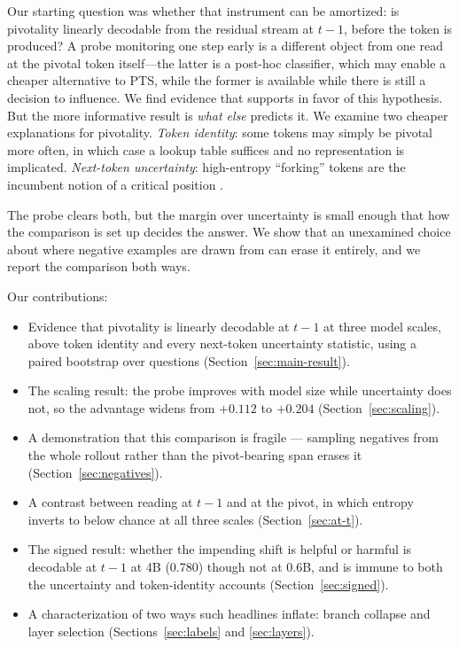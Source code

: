 \documentclass{article}
\begin{document}
Our starting question was whether that instrument can be amortized: is
pivotality linearly decodable from the residual stream at $t-1$, before the
token is produced? A probe monitoring one step early is a different object from
one read at the pivotal token itself---the latter is a post-hoc
classifier, which may enable a cheaper alternative to PTS, 
while the former is available while there is still a decision to
influence. We find evidence that supports in favor of this hypothesis. 
But the more informative result is \emph{what else} predicts it.
We examine two cheaper explanations for pivotality. \emph{Token identity}: some
tokens may simply be pivotal more often, in which case a lookup table
suffices and no representation is implicated. \emph{Next-token
uncertainty}: high-entropy ``forking'' tokens are the incumbent notion of
a critical position \citep{wang2025beyond8020}.

The probe clears both, but the margin over uncertainty is small enough
that how the comparison is set up decides the answer. We show that an
unexamined choice about where negative examples are drawn from can erase
it entirely, and we report the comparison both ways.

Our contributions:

\begin{itemize}
  \item Evidence that pivotality is linearly decodable at $t-1$ at three
    model scales, above token identity and every next-token uncertainty
    statistic, using a paired bootstrap over questions
    (Section~\ref{sec:main-result}).
  \item The scaling result: the probe improves with model size while
    uncertainty does not, so the advantage widens from $+0.112$ to
    $+0.204$ (Section~\ref{sec:scaling}).
  \item A demonstration that this comparison is fragile --- sampling
    negatives from the whole rollout rather than the pivot-bearing span
    erases it (Section~\ref{sec:negatives}).
  \item A contrast between reading at $t-1$ and at the pivot, in which
    entropy inverts to below chance at all three scales
    (Section~\ref{sec:at-t}).
  \item The signed result: whether the impending shift is helpful or
    harmful is decodable at $t-1$ at 4B (0.780) though not at 0.6B, and is
    immune to both the uncertainty and token-identity accounts
    (Section~\ref{sec:signed}).
  \item A characterization of two ways such headlines inflate: branch
    collapse and layer selection (Sections~\ref{sec:labels} and
    \ref{sec:layers}).
\end{itemize}
\end{document}
